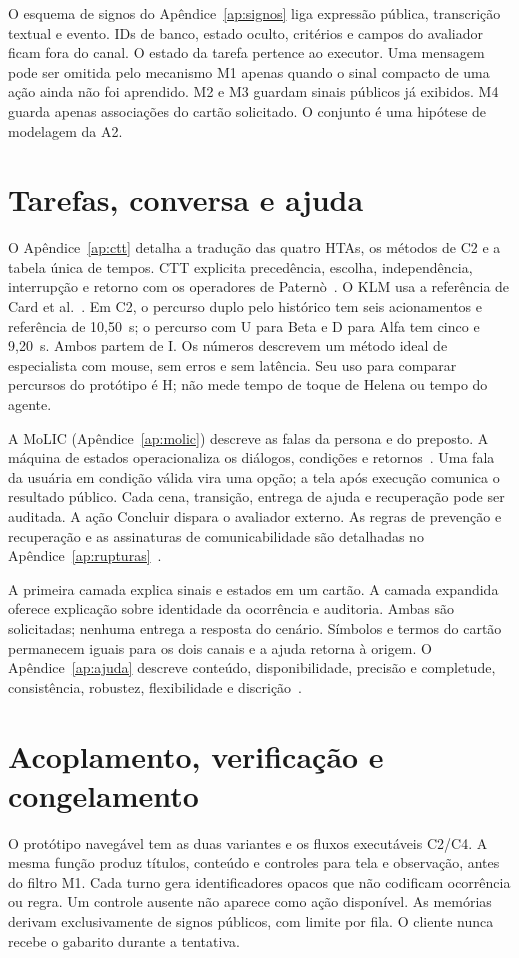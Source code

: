 O esquema de signos do Apêndice~\ref{ap:signos} liga expressão pública, transcrição textual e evento. IDs de banco, estado oculto, critérios e campos do avaliador ficam fora do canal. O estado da tarefa pertence ao executor. Uma mensagem pode ser omitida pelo mecanismo M1 apenas quando o sinal compacto de uma ação ainda não foi aprendido. M2 e M3 guardam sinais públicos já exibidos. M4 guarda apenas associações do cartão solicitado. O conjunto é uma hipótese de modelagem da A2.

\section{Tarefas, conversa e ajuda}
O Apêndice~\ref{ap:ctt} detalha a tradução das quatro HTAs, os métodos de C2 e a tabela única de tempos. CTT explicita precedência, escolha, independência, interrupção e retorno com os operadores de Paternò~\cite[pp. 489--492]{paterno}. O KLM usa a referência de Card et al.~\cite[pp. 397--400]{card}. Em C2, o percurso duplo pelo histórico tem seis acionamentos e referência de 10,50~s; o percurso com U para Beta e D para Alfa tem cinco e 9,20~s. Ambos partem de I. Os números descrevem um método ideal de especialista com mouse, sem erros e sem latência. Seu uso para comparar percursos do protótipo é H; não mede tempo de toque de Helena ou tempo do agente.

A MoLIC (Apêndice~\ref{ap:molic}) descreve as falas da persona e do preposto. A máquina de estados operacionaliza os diálogos, condições e retornos~\cite{molic}\cite[pp. 9--31]{guiamolic}\cite[cap. 16]{dix}. Uma fala da usuária em condição válida vira uma opção; a tela após execução comunica o resultado público. Cada cena, transição, entrega de ajuda e recuperação pode ser auditada. A ação Concluir dispara o avaliador externo. As regras de prevenção e recuperação e as assinaturas de comunicabilidade são detalhadas no Apêndice~\ref{ap:rupturas}~\cite[cap. 7]{barbosa}\cite[pp. 31--38]{mac}.

 A primeira camada explica sinais e estados em um cartão. A camada expandida oferece explicação sobre identidade da ocorrência e auditoria. Ambas são solicitadas; nenhuma entrega a resposta do cenário. Símbolos e termos do cartão permanecem iguais para os dois canais e a ajuda retorna à origem. O Apêndice~\ref{ap:ajuda} descreve conteúdo, disponibilidade, precisão e completude, consistência, robustez, flexibilidade e discrição~\cite[p. 397]{dix}.

\section{Acoplamento, verificação e congelamento}
O protótipo navegável tem as duas variantes e os fluxos executáveis C2/C4. A mesma função produz títulos, conteúdo e controles para tela e observação, antes do filtro M1. Cada turno gera identificadores opacos que não codificam ocorrência ou regra. Um controle ausente não aparece como ação disponível. As memórias derivam exclusivamente de signos públicos, com limite por fila. O cliente nunca recebe o gabarito durante a tentativa.

